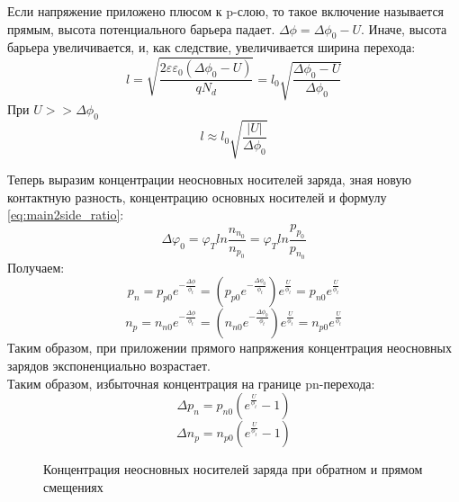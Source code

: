 Если напряжение приложено плюсом к p-слою, то такое включение называется прямым, высота потенциального барьера падает. $\Delta \phi  = \Delta \phi_0 - U$.
Иначе, высота барьера увеличивается, и, как следствие, увеличивается ширина перехода:
\begin{equation}
l = \sqrt{\frac{2 \varepsilon \varepsilon_0 ( \Delta \phi_0 - U)}{q N_d} } = l_0 \sqrt{\frac{\Delta \phi_0 -U}{\Delta \phi_0}}
\end{equation} 
При $U >> \Delta \phi_0$ 
\begin{equation}
l \approx l_0 \sqrt{\frac{|U|}{\Delta \phi_0}}
\end{equation}

Теперь выразим концентрации неосновных носителей заряда, зная новую контактную разность, концентрацию основных носителей и формулу \ref{eq:main2side_ratio}:
\begin{equation}
\Delta\varphi_0 = \varphi_Tln\frac{n_{n_0}}{n_{p_0}} = \varphi_Tln\frac{p_{p_0}}{p_{n_0}}
\end{equation}
Получаем:
\begin{equation}
p_n = p_{p0} e^{- \frac{\Delta \phi }{\phi_t}} = (p_{p0} e^{- \frac{\Delta \phi_0 }{\phi_t}}) e^{\frac{U}{\phi_t}} = 
p_{n0} e^{\frac{U}{\phi_t}}
\end{equation}
\begin{equation}
n_p = n_{n0} e^{- \frac{\Delta \phi }{\phi_t}} = (n_{n0} e^{- \frac{\Delta \phi_0 }{\phi_t}}) e^{\frac{U}{\phi_t}} = 
n_{p0} e^{\frac{U}{\phi_t}}
\end{equation}
Таким образом, при приложении прямого напряжения концентрация неосновных зарядов экспоненциально возрастает.\\
Таким образом, избыточная концентрация на границе pn-перехода:
\begin{equation}
\Delta p_n = p_{n0} (e^{\frac{U}{\phi_t}}-1)
\end{equation}
\begin{equation}
\Delta n_p = n_{p0} (e^{\frac{U}{\phi_t}}-1)
\end{equation}

\begin{center}
	\begin{figure}[h!]
		\caption{Концентрация неосновных носителей заряда при обратном и прямом смещениях}	
		\label{pic:pn-conc_U}
	\end{figure}
\end{center}



